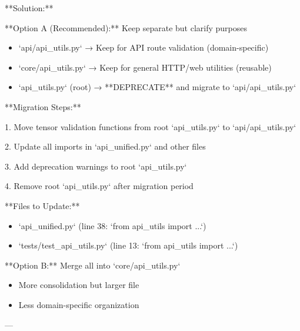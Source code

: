 \documentclass[11pt,a4paper]{article}
\begin{document}
**Solution:**

**Option A (Recommended):** Keep separate but clarify purposes

\begin{itemize}
\item `api/api_utils.py` → Keep for API route validation (domain-specific)
\end{itemize}

\begin{itemize}
\item `core/api_utils.py` → Keep for general HTTP/web utilities (reusable)
\end{itemize}

\begin{itemize}
\item `api_utils.py` (root) → **DEPRECATE** and migrate to `api/api_utils.py`
\end{itemize}

**Migration Steps:**

1. Move tensor validation functions from root `api\_utils.py` to `api/api\_utils.py`

2. Update all imports in `api\_unified.py` and other files

3. Add deprecation warnings to root `api\_utils.py`

4. Remove root `api\_utils.py` after migration period

**Files to Update:**

\begin{itemize}
\item `api_unified.py` (line 38: `from api_utils import ...`)
\end{itemize}

\begin{itemize}
\item `tests/test_api_utils.py` (line 13: `from api_utils import ...`)
\end{itemize}

**Option B:** Merge all into `core/api\_utils.py`

\begin{itemize}
\item More consolidation but larger file
\end{itemize}

\begin{itemize}
\item Less domain-specific organization
\end{itemize}

---
\end{document}
